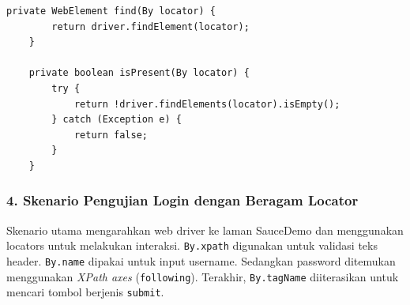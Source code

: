\documentclass[a4paper,oneside,12pt]{report}
\begin{document}
\begin{lstlisting}[style=javastyle, caption=Helper Method]
    private WebElement find(By locator) {
        return driver.findElement(locator);
    }

    private boolean isPresent(By locator) {
        try {
            return !driver.findElements(locator).isEmpty();
        } catch (Exception e) {
            return false;
        }
    }
\end{lstlisting}

\subsubsection*{4. Skenario Pengujian Login dengan Beragam Locator}
Skenario utama mengarahkan web driver ke laman SauceDemo dan menggunakan locators untuk melakukan interaksi. \texttt{By.xpath} digunakan untuk validasi teks header. \texttt{By.name} dipakai untuk input username. Sedangkan password ditemukan menggunakan \textit{XPath axes} (\texttt{following}). Terakhir, \texttt{By.tagName} diiterasikan untuk mencari tombol berjenis \texttt{submit}.
\end{document}
